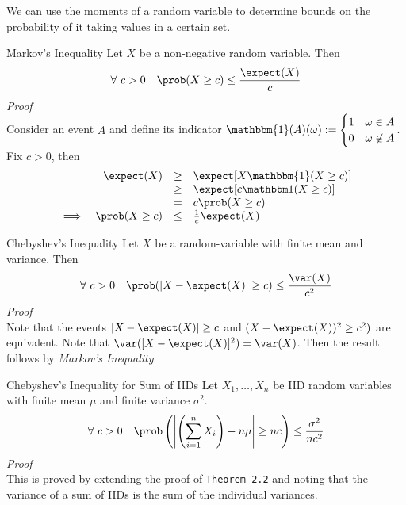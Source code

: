 \documentclass[11pt,a4paper]{article}
\begin{document}
  \begin{remark}{We can use the moments of a random variable to determine bounds on the probability of it taking values in a certain set.}
  \end{remark}

  \begin{theorem}{Markov's Inequality}
    Let $X$ be a non-negative random variable. Then
    \[ \forall\ c>0\quad\prob(X\geq c)\leq\frac{\expect(X)}c \]
    \textit{Proof}\\
    Consider an event $A$ and define its indicator $\mathbbm{1}(A)(\omega):=\begin{cases}1&\omega\in A\\0&\omega\not\in A\end{cases}$. Fix $c>0$, then
    \[\begin{array}{rrcl}
      &\expect(X)&\geq&\expect[X\mathbbm{1}(X\geq c)]\\
      &&\geq&\expect[c\mathbbm1(X\geq c)]\\
      &&=&c\prob(X\geq c)\\
      \implies&\prob(X\geq c)&\leq&\frac1c\expect(X)
    \end{array}\]
  \end{theorem}

  \begin{theorem}{Chebyshev's Inequality}
    Let $X$ be a random-variable with finite mean and variance. Then
    \[ \forall\ c>0\quad\prob(|X-\expect(X)|\geq c)\leq\frac{\var(X)}{c^2}\]
    \textit{Proof}\\
    Note that the events $|X-\expect(X)|\geq c$ and $(X-\expect(X))^2\ge c^2)$ are equivalent. Note that $\var([X-\expect(X)]^2)=\var(X)$. Then the result follows by \textit{Markov's Inequality}.
  \end{theorem}

  \begin{theorem}{Chebyshev's Inequality for Sum of IIDs}
    Let $X_1,\dots,X_n$ be IID random variables with finite mean $\mu$ and finite variance $\sigma^2$.
    \[ \forall\ c>0\quad\prob\left(\left|\left(\sum_{i=1}^nX_i\right)-n\mu\right|\geq nc\right)\leq\frac{\sigma^2}{nc^2} \]
    \textit{Proof}\\
    This is proved by extending the proof of \texttt{Theorem 2.2} and noting that the variance of a sum of IIDs is the sum of the individual variances.
  \end{theorem}
\end{document}

